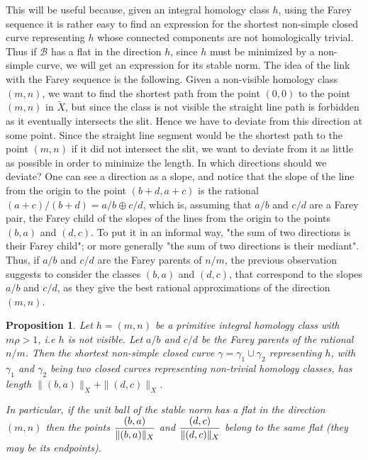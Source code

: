 \documentclass{article}
\newcommand{\Bb}{\mathcal{B}}
\newcommand{\St}[1]{\|#1\|_X}
\newtheorem{prop}[thm]{Proposition}
\theoremstyle{definition}
\begin{document}
This will be useful because, given an integral homology class $h$, using the Farey sequence it is rather easy to find an expression for the shortest non-simple closed curve representing $h$ whose connected components are not homologically trivial. Thus if $\Bb$ has a flat in the direction $h$, since $h$ must be minimized by a non-simple curve, we will get an expression for its stable norm. The idea of the link with the Farey sequence is the following. Given a non-visible homology class $(m,n)$, we want to find the shortest path from the point $(0,0)$ to the point $(m,n)$ in $\tilde{X}$, but since the class is not visible the straight line path is forbidden as it eventually intersects the slit. Hence we have to deviate from this direction at some point. Since the straight line segment would be the shortest path to the point $(m,n)$ if it did not intersect the slit, we want to deviate from it as little as possible in order to minimize the length. In which directions should we deviate? One can see a direction as a slope, and notice that the slope of the line from the origin to the point $(b+d,a+c)$ is the rational $(a+c)/(b+d) = a/b \oplus c/d$, which is, assuming that $a/b$ and $c/d$ are a Farey pair, the Farey child of the slopes of the lines from the origin to the points $(b,a)$ and $(d,c)$. To put it in an informal way, "the sum of two directions is their Farey child"; or more generally "the sum of two directions is their mediant". Thus, if $a/b$ and $c/d$ are the Farey parents of $n/m$, the previous observation suggests to consider the classes $(b,a)$ and $(d,c)$, that correspond to the slopes $a/b$ and $c/d$, as they give the best rational approximations of the direction $(m,n)$.



\begin{prop}\label{non simple}
	Let $h=(m,n)$ be a primitive integral homology class with $m\rho  > 1 $, i.e $h$ is not visible. Let $a/b$ and $c/d$ be the Farey parents of the rational $n/m$. Then the shortest non-simple closed curve $\gamma = \gamma_1 \cup \gamma_2$   representing $h$, with $\gamma_1$ and $\gamma_2$ being two closed curves representing non-trivial homology classes, has length $ \St{(b,a)} + \St{(d,c)} $.
	
	In particular, if the unit ball of the stable norm has a flat in the direction $(m,n)$ then the points $\mathlarger{\frac{(b,a)}{\St{(b,a)}}}$ and $\mathlarger{\frac{(d,c)}{\St{(d,c)}}}$ belong to the same flat (they may be its endpoints).
\end{prop}
\end{document}

